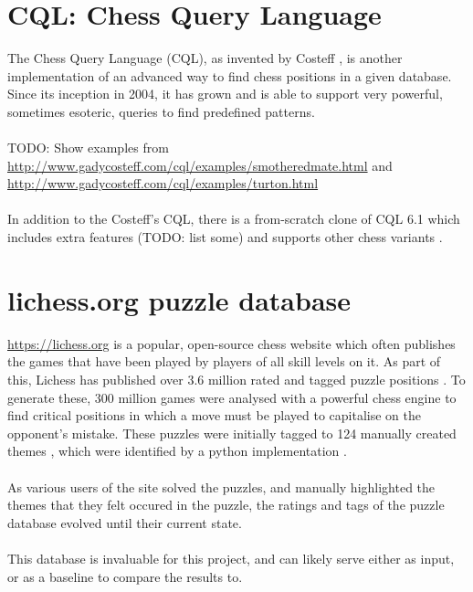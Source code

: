 \section{CQL: Chess Query Language}
The Chess Query Language (CQL), as invented by Costeff \cite{cql}, is another 
implementation of an advanced way to find chess positions in a given database.
Since its inception in 2004, it has grown and is able to support very powerful,
sometimes esoteric, queries to find predefined patterns.
\\~\\
TODO: Show examples from \url{http://www.gadycosteff.com/cql/examples/smotheredmate.html}
and \url{http://www.gadycosteff.com/cql/examples/turton.html}
\\~\\
In addition to the Costeff's CQL, there is a from-scratch clone of CQL 6.1 which includes
extra features (TODO: list some) and supports other chess variants \cite{cqli}.

\section{lichess.org puzzle database}
\url{https://lichess.org} is a popular, open-source chess website which often
publishes the games that have been played by players of all skill levels on it.
As part of this, Lichess has published over 3.6 million rated and tagged
puzzle positions \cite{lichessPuzzles}. To generate these, 300 million games
were analysed with a powerful chess engine to find critical positions in which
a move must be played to capitalise on the opponent's mistake. These puzzles
were initially tagged to 124 manually created themes \cite{lichessXML}, which
were identified by a python implementation \cite{lichessTagger}. 
\\~\\
As various users of the site solved the puzzles, and manually highlighted the
themes that they felt occured in the puzzle, the ratings and tags of the puzzle
database evolved until their current state.
\\~\\
This database is invaluable for this project, and can likely serve either as input,
or as a baseline to compare the results to.

